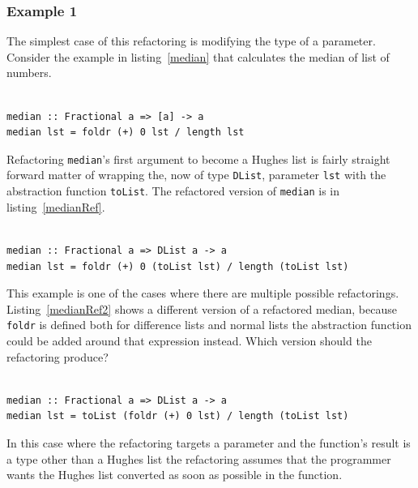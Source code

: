 \subsubsection{Example 1}

The simplest case of this refactoring is modifying the type of a parameter. Consider the example in listing~\ref{median} that calculates the median of list of numbers. 

\begin{lstlisting}[caption={Calculating a median}, label=median]

median :: Fractional a => [a] -> a
median lst = foldr (+) 0 lst / length lst

\end{lstlisting} 

Refactoring \texttt{median}'s first argument to become a Hughes list is fairly straight forward matter of wrapping the, now of type \texttt{DList}, parameter \texttt{lst} with the abstraction function \texttt{toList}. The refactored version of \texttt{median} is in listing~\ref{medianRef}. 

\begin{lstlisting}[caption={\texttt{median} refactored}, label=medianRef]

median :: Fractional a => DList a -> a
median lst = foldr (+) 0 (toList lst) / length (toList lst)

\end{lstlisting}    

This example is one of the cases where there are multiple possible refactorings. Listing~\ref{medianRef2} shows a different version of a refactored median, because \texttt{foldr} is defined both for difference lists and normal lists the abstraction function could be added around that expression instead. Which version should the refactoring produce?

\begin{lstlisting}[caption={\texttt{median} refactored another way.}, label=medianRef2]

median :: Fractional a => DList a -> a
median lst = toList (foldr (+) 0 lst) / length (toList lst)

\end{lstlisting}    

In this case where the refactoring targets a parameter and the function's result is a type other than a Hughes list the refactoring assumes that the programmer wants the Hughes list converted as soon as possible in the function. 

